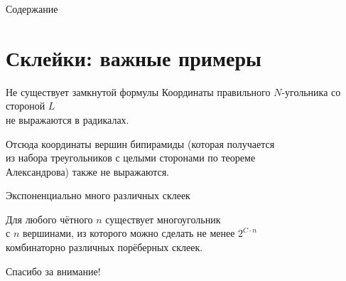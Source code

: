 \documentclass[12pt,aspectratio=169,svgnames]{beamer}
\begin{document}
 \maketitle

\begin{frame}{Содержание}
	\tableofcontents
\end{frame}

\section{Склейки: важные примеры}

\begin{frame}{Не существует замкнутой формулы}
	Координаты правильного \(N\)-угольника со стороной \(L\) \\
	не выражаются в радикалах. \vspace{-3mm}

	\begin{center}  \end{center} \vspace{-4mm}

	Отсюда координаты вершин бипирамиды (которая получается\\
	из набора треугольников с целыми сторонами по теореме\\
	Александрова) также не выражаются.
\end{frame}

\begin{frame}{Экспоненциально много различных склеек} \ \\ [-0.2cm]
   \begin{thm}
	Для любого чётного \(n\) существует многоугольник\\
	с \(n\) вершинами, из которого можно сделать не менее \(2^{C \cdot n}\)\\
	комбинаторно различных \alert{порёберных} склеек.
   \end{thm}
   \begin{center}  \end{center}
\end{frame}

\begin{frame}{Спасибо за внимание!}
	\tableofcontents
\end{frame}
\end{document}
